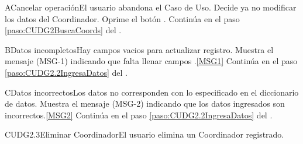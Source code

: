 		\begin{UCtrayectoriaA}{A}{Cancelar operación}{El usuario abandona el Caso de Uso.}
			\UCpaso[\UCactor] Decide ya no modificar los datos del Coordinador.
			\UCpaso[\UCactor] Oprime el botón .
			\UCpaso Continúa en el paso \ref{paso:CUDG2BuscaCoords} del .
		\end{UCtrayectoriaA}

	\begin{UCtrayectoriaA}{B}{Datos incompletos}{Hay campos vacios para actualizar registro.}
			\UCpaso Muestra el mensaje (MSG-1) indicando que falta llenar campos .\ref{MSG1} 
			\UCpaso Continúa en el paso \ref{paso:CUDG2.2IngresaDatos} del .
	\end{UCtrayectoriaA}

	\begin{UCtrayectoriaA}{C}{Datos incorrectos}{Los datos no corresponden con lo especificado en el diccionario de datos.}
			\UCpaso Muestra el mensaje (MSG-2) indicando que los datos ingresados son incorrectos.\ref{MSG2}
			\UCpaso Continúa en el paso \ref{paso:CUDG2.2IngresaDatos} del .
	\end{UCtrayectoriaA}

	\begin{UseCase}{CUDG2.3}{Eliminar Coordinador}{El usuario elimina un Coordinador registrado.}
	\end{UseCase}

